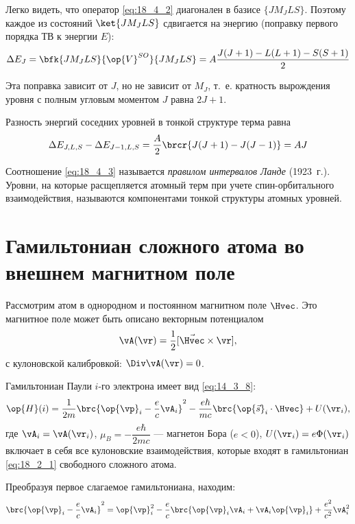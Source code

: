 Легко видеть, что оператор \eqref{eq:18_4_2} диагонален в базисе $\{ J M_J L S\}$. Поэтому каждое из состояний $\ket{J M_J L S}$ сдвигается на энергию (поправку первого порядка ТВ к энергии $E$):
$$
\Delta E_J = \bfk{J M_J L S}{\op{V}^{SO}}{J M_J L S} = A \frac{J(J+1) - L(L+1) - S(S+1)}{2}
$$

Эта поправка зависит от $J$, но не зависит от $M_J$, т.~е. кратность вырождения уровня с полным угловым моментом $J$ равна $2J+1$.

Разность энергий соседних уровней в тонкой структуре терма равна
\begin{equation}
\label{eq:18_4_3}
\Delta E_{J,L,S} - \Delta E_{J-1, L, S} = \frac{A}{2}\brcr{J(J+1) - J(J-1)} = AJ
\end{equation}

Соотношение \eqref{eq:18_4_3} называется {\em правилом интервалов Ланде}\footnotemark{} (1923~г.). Уровни, на которые расщепляется атомный терм при учете спин-орбитального взаимодействия, называются компонентами тонкой структуры атомных уровней.

\section{Гамильтониан сложного атома во внешнем магнитном поле}

Рассмотрим атом в однородном и постоянном магнитном поле $\Hvec$. Это магнитное поле может быть описано векторным потенциалом
$$
\vA(\vr) = \frac{1}{2}[\vec{\Hvec} \times \vr],
$$
с кулоновской калибровкой: $\Div \vA(\vr) = 0$.

Гамильтониан Паули $i$-го электрона имеет вид \eqref{eq:14_3_8}:
\begin{equation}
\label{eq:18_5_1}
\op{H}(i) = \frac{1}{2m}\brc{\op{\vp}_i - \frac{e}{c}\vA_i}^2 - \frac{e\hbar}{mc}\brc{\op{\vec{s}}_i \cdot \Hvec} + U(\vr_i),
\end{equation}
где $\vA_i = \vA(\vr_i)$, $\mu_B = -\dfrac{e\hbar}{2mc}$ --- магнетон Бора ($e < 0$), $U(\vr_i) = e\Phi(\vr_i)$ включает в себя все кулоновские взаимодействия, которые входят в гамильтониан \eqref{eq:18_2_1} свободного сложного атома.

Преобразуя первое слагаемое гамильтониана, находим:
\begin{gather*}
\brc{\op{\vp}_i - \frac{e}{c}\vA_i}^2 = \op{\vp}_i^2 - \frac{e}{c}\brc{\op{\vp}_i \vA_i + \vA_i \op{\vp}_i} + \frac{e^2}{c^2}\vA_i^2 
\end{gather*}

